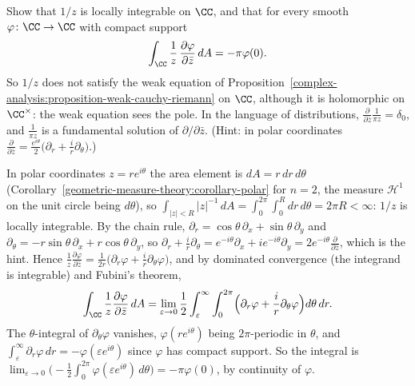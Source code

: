 \begin{exercise}\label{complex-analysis:exercise-cauchy-kernel-dbar}
Show that $1/z$ is locally integrable on $\CC$, and that for every smooth $\varphi \colon \CC \to \CC$ with compact support
\[
\int_\CC\frac1z\,\frac{\partial\varphi}{\partial\bar z}\,dA = -\pi\varphi(0).
\]
So $1/z$ does not satisfy the weak equation of Proposition~\ref{complex-analysis:proposition-weak-cauchy-riemann} on $\CC$, although it is holomorphic on $\CC^\times$: the weak equation sees the pole. In the language of
distributions, $\frac{\partial}{\partial\bar z}\frac{1}{\pi z} = \delta_0$, and $\frac1{\pi z}$ is a fundamental solution of $\partial/\partial\bar z$. (Hint: in polar coordinates
$\frac{\partial}{\partial\bar z} = \frac{e^{i\theta}}{2}\bigl(\partial_r + \frac ir\partial_\theta\bigr)$.)
\end{exercise}

\begin{solution}
In polar coordinates $z = re^{i\theta}$ the area element is $dA = r\,dr\,d\theta$ (Corollary~\ref{geometric-measure-theory:corollary-polar} for $n = 2$, the measure $\mathcal{H}^1$ on the unit circle being $d\theta$), so
$\int_{|z| < R}|z|^{-1}\,dA = \int_0^{2\pi}\int_0^R dr\,d\theta = 2\pi R < \infty$: $1/z$ is locally integrable. By the chain rule, $\partial_r = \cos\theta\,\partial_x + \sin\theta\,\partial_y$ and
$\partial_\theta = -r\sin\theta\,\partial_x + r\cos\theta\,\partial_y$, so $\partial_r + \frac ir\partial_\theta = e^{-i\theta}\partial_x + ie^{-i\theta}\partial_y = 2e^{-i\theta}\frac{\partial}{\partial\bar z}$, which is the hint.
Hence $\frac1z\frac{\partial\varphi}{\partial\bar z} = \frac{1}{2r}\bigl(\partial_r\varphi + \frac ir\partial_\theta\varphi\bigr)$, and by dominated convergence (the integrand is integrable) and Fubini's theorem,
\[
\int_\CC\frac1z\frac{\partial\varphi}{\partial\bar z}\,dA = \lim_{\varepsilon \to 0}\frac12\int_\varepsilon^\infty\int_0^{2\pi}\Bigl(\partial_r\varphi + \frac ir\partial_\theta\varphi\Bigr)d\theta\,dr .
\]
The $\theta$-integral of $\partial_\theta\varphi$ vanishes, $\varphi(re^{i\theta})$ being $2\pi$-periodic in $\theta$, and $\int_\varepsilon^\infty\partial_r\varphi\,dr = -\varphi(\varepsilon e^{i\theta})$ since $\varphi$ has compact support.
So the integral is $\lim_{\varepsilon \to 0}\bigl(-\frac12\int_0^{2\pi}\varphi(\varepsilon e^{i\theta})\,d\theta\bigr) = -\pi\varphi(0)$, by continuity of $\varphi$.
\end{solution}
